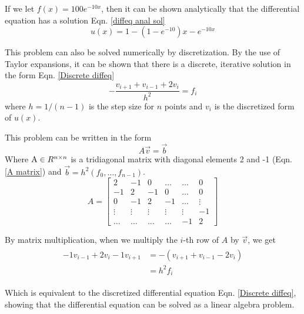 \documentclass[10pt,showpacs,preprintnumbers,footinbib,amsmath,amssymb,aps,prl,twocolumn,groupedaddress,superscriptaddress,showkeys]{revtex4-1}
\begin{document}
  If we let $f(x) = 100e^{-10x}$, then it can be shown analytically that the differential equation has a solution Eqn. \ref{diffeq anal sol}
  \begin{equation}
    \label{diffeq anal sol}
    u(x) = 1 - (1 - e^{-10})x - e^{-10x}
  \end{equation}

  This problem can also be solved numerically by discretization. By the use of Taylor expansions, it can be shown that there is a discrete, iterative solution in the form Eqn. \ref{Discrete diffeq} \cite{lecture_notes}
  \begin{equation}
    \label{Discrete diffeq}
    - \frac{v_{i+1} + v_{i-1} + 2v_i}{h^2} = f_i
  \end{equation}
  where $h = 1/(n-1)$ is the step size for $n$ points and $v_i$ is the discretized form of $u(x)$.

  This problem can be written in the form 
  \begin{equation}
    A\vec v = \vec b
  \end{equation}
  Where $\textup A \in R^{n \times n}$ is a tridiagonal matrix with diagonal elements 2 and -1 (Eqn. \ref{A matrix}) and $\vec b =h^2(f_0, \dots, f_{n-1})$.
  \begin{equation}
    \label{A matrix}
    A = \left[ 
    \begin{matrix}
      2 & -1 & 0 & \dots  & \dots &0 \\
      -1 & 2 & -1 & 0 & \dots &  0 \\
      0 & -1 & 2 & -1 & \dots & \vdots  \\
      \vdots & \vdots & \vdots & \vdots & \vdots & -1\\
      \dots & \dots & \dots & \dots & -1 & 2
    \end{matrix}
    \right]
  \end{equation}

  By matrix multiplication, when we multiply   the $i$-th row of $A$ by $\vec v$, we get
  \begin{align}
  \begin{split}
 -1 v_{i -1} + 2v_i - 1v_{i+1}  &= -\left( v_{i+1} + v_{i-1} - 2v_i\right) 
                                \\&= h^2f_i
  \end{split}
  \end{align}

  Which is equivalent to the discretized differential equation Eqn. \ref{Discrete diffeq},
  showing that the differential equation can be solved as a linear algebra problem. 
\end{document}

